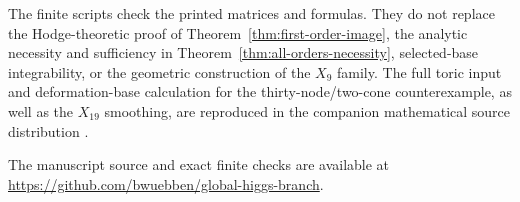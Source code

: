 The finite scripts check the printed matrices and
formulas. They do not replace the Hodge-theoretic proof of
Theorem~\ref{thm:first-order-image}, the analytic necessity and sufficiency
in Theorem~\ref{thm:all-orders-necessity}, selected-base integrability, or
the geometric construction of the $X_9$ family. The full toric input and
deformation-base calculation for the thirty-node/two-cone counterexample,
as well as the $X_{19}$ smoothing, are reproduced in the companion
mathematical source distribution \cite{Wuebben:2026smoothing}.

The manuscript source and exact finite checks are available at
\url{https://github.com/bwuebben/global-higgs-branch}.
